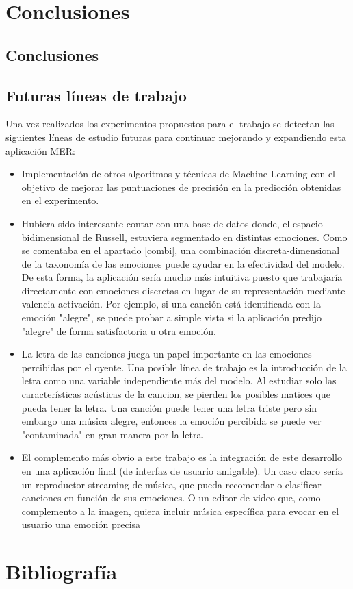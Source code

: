 \documentclass[12pt,a4paper,Spanish]{article}
\begin{document}
\newpage
\section{Conclusiones}

\subsection{Conclusiones}
\subsection{Futuras líneas de trabajo}

Una vez realizados los experimentos propuestos para el trabajo se detectan las siguientes líneas de estudio futuras para continuar mejorando y expandiendo esta aplicación MER:
\begin{itemize}
	\item Implementación de otros algoritmos y técnicas de Machine Learning con el objetivo de mejorar las puntuaciones de precisión en la predicción obtenidas en el experimento.
	\item Hubiera sido interesante contar con una base de datos donde, el espacio bidimensional de Russell, estuviera segmentado en distintas emociones. Como se comentaba en el apartado \ref{combi}, una combinación discreta-dimensional de la taxonomía de las emociones puede ayudar en la efectividad del modelo. De esta forma, la aplicación sería mucho más intuitiva puesto que trabajaría directamente con emociones discretas en lugar de su representación mediante valencia-activación. Por ejemplo, si una canción está identificada con la emoción "alegre", se puede probar a simple vista si la aplicación predijo "alegre" de forma satisfactoria u otra emoción.
	\item La letra de las canciones juega un papel importante en las emociones percibidas por el oyente. Una posible línea de trabajo es la introducción de la letra como una variable independiente más del modelo. Al estudiar solo las características acústicas de la cancion, se pierden los posibles matices que pueda tener la letra. Una canción puede tener una letra triste pero sin embargo una música alegre, entonces la emoción percibida se puede ver "contaminada" en gran manera por la letra.
	\item El complemento más obvio a este trabajo es la integración de este desarrollo en una aplicación final (de interfaz de usuario amigable). Un caso claro sería un reproductor streaming de música, que pueda recomendar o clasificar canciones en función de sus emociones. O un editor de video que, como complemento a la imagen, quiera incluir música específica para evocar en el usuario una emoción precisa
\end{itemize}





\newpage
\section{Bibliografía}
\printbibliography
\end{document}
